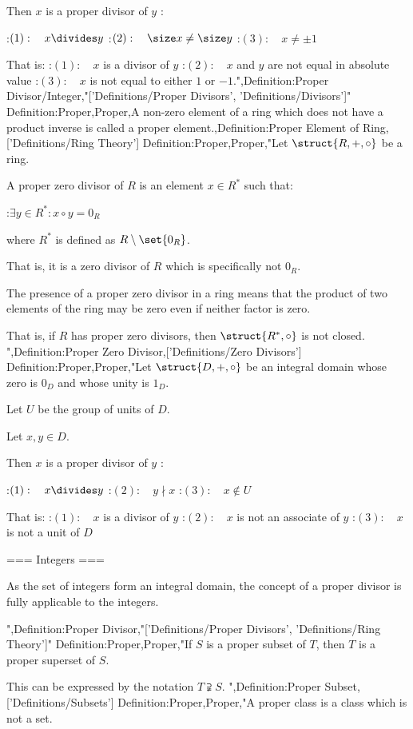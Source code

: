 Then $x$ is a proper divisor of $y$ :

:$(1): \quad x \divides y$
:$(2): \quad \size x \ne \size y$
:$(3): \quad x \ne \pm 1$

That is:
:$(1): \quad x$ is a divisor of $y$
:$(2): \quad x$ and $y$ are not equal in absolute value
:$(3): \quad x$ is not equal to either $1$ or $-1$.",Definition:Proper Divisor/Integer,"['Definitions/Proper Divisors', 'Definitions/Divisors']"
Definition:Proper,Proper,A non-zero element of a ring which does not have a product inverse is called a proper element.,Definition:Proper Element of Ring,['Definitions/Ring Theory']
Definition:Proper,Proper,"Let $\struct {R, +, \circ}$ be a ring.


A proper zero divisor of $R$ is an element $x \in R^*$ such that:

:$\exists y \in R^*: x \circ y = 0_R$

where $R^*$ is defined as $R \setminus \set {0_R}$.


That is, it is a zero divisor of $R$ which is specifically not $0_R$.


The presence of a proper zero divisor in a ring means that the product of two elements of the ring may be zero even if neither factor is zero.

That is, if $R$ has proper zero divisors, then $\struct {R^*, \circ}$ is not closed.
",Definition:Proper Zero Divisor,['Definitions/Zero Divisors']
Definition:Proper,Proper,"Let $\struct {D, +, \circ}$ be an integral domain whose zero is $0_D$ and whose unity is $1_D$.

Let $U$ be the group of units of $D$.

Let $x, y \in D$.


Then $x$ is a proper divisor of $y$ :

:$(1): \quad x \divides y$
:$(2): \quad y \nmid x$
:$(3): \quad x \notin U$

That is:
:$(1): \quad x$ is a divisor of $y$
:$(2): \quad x$ is not an associate of $y$
:$(3): \quad x$ is not a unit of $D$


=== Integers ===

As the set of integers form an integral domain, the concept of a proper divisor is fully applicable to the integers.

",Definition:Proper Divisor,"['Definitions/Proper Divisors', 'Definitions/Ring Theory']"
Definition:Proper,Proper,"If $S$ is a proper subset of $T$, then $T$ is a proper superset of $S$.

This can be expressed by the notation $T \supsetneqq S$.
",Definition:Proper Subset,['Definitions/Subsets']
Definition:Proper,Proper,"A proper class is a class which is not a set.

